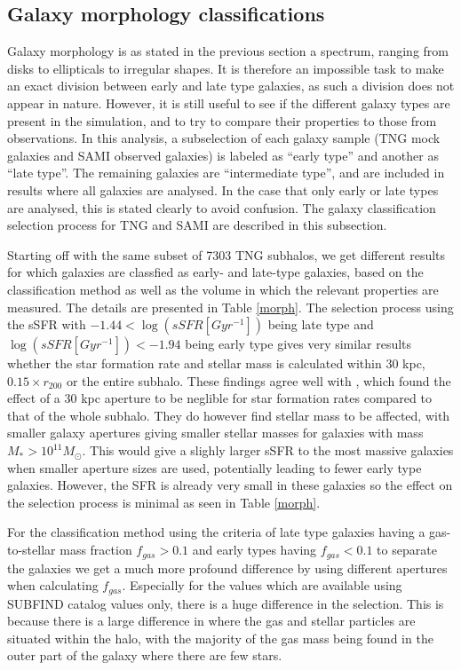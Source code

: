 \subsection{Galaxy morphology classifications}

Galaxy morphology is as stated in the previous section a spectrum, ranging from disks to ellipticals to irregular shapes. It is therefore an impossible task to make an exact division between early and late type galaxies, as such a division does not appear in nature. However, it is still useful to see if the different galaxy types are present in the simulation, and to try to compare their properties to those from observations. In this analysis, a subselection of each galaxy sample (TNG mock galaxies and SAMI observed galaxies) is labeled as ``early type'' and another as ``late type''. The remaining galaxies are ``intermediate type'', and are included in results where all galaxies are analysed. In the case that only early or late types are analysed, this is stated clearly to avoid confusion. The galaxy classification selection process for TNG and SAMI are described in this subsection.

Starting off with the same subset of 7303 TNG subhalos, we get different results for which galaxies are classfied as early- and late-type galaxies, based on the classification method as well as the volume in which the relevant properties are measured. The details are presented in Table \ref{morph}. The selection process using the sSFR with $ -1.44 < \log (sSFR[Gyr^{-1}]) $ being late type and $\log (sSFR[Gyr^{-1}]) < -1.94$ being early type gives very similar results whether the star formation rate and stellar mass is calculated within 30 kpc, $0.15 \times r_{200}$ or the entire subhalo. These findings agree well with \textcite{Schaye2015}, which found the effect of a 30 kpc aperture to be neglible for star formation rates compared to that of the whole subhalo. They do however find stellar mass to be affected, with smaller galaxy apertures giving smaller stellar masses for galaxies with mass $M_* > 10^{11}M_{\odot}$. This would give a slighly larger sSFR to the most massive galaxies when smaller aperture sizes are used, potentially leading to fewer early type galaxies. However, the SFR is already very small in these galaxies so the effect on the selection process is minimal as seen in Table \ref{morph}.

For the classification method using the criteria of late type galaxies having a gas-to-stellar mass fraction $f_{gas} > 0.1$ and early types having $f_{gas} < 0.1$ to separate the galaxies we get a much more profound difference by using different apertures when calculating $f_{gas}$. Especially for the values which are available using SUBFIND catalog values only, there is a huge difference in the selection. This is because there is a large difference in where the gas and stellar particles are situated within the halo, with the majority of the gas mass being found in the outer part of the galaxy where there are few stars.

